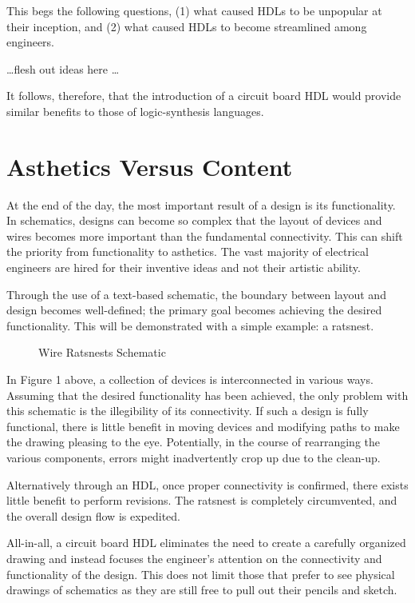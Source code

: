 \documentclass[10pt, draft, conference, letterpaper, twocolumn]{IEEEtran}
\begin{document}
	This begs the following questions, (1) what caused HDLs to be unpopular at
	their inception, and (2) what caused HDLs to become streamlined among
	engineers.

	\ldots flesh out ideas here \ldots

	It follows, therefore, that the introduction of a circuit board HDL would
	provide similar benefits to those of logic-synthesis languages.

\section{Asthetics Versus Content}
	At the end of the day, the most important result of a design is its
	functionality.  In schematics, designs can become so complex that the layout of
	devices and wires becomes more important than the fundamental connectivity.
	This can shift the priority from functionality to asthetics. The vast majority
	of electrical engineers are hired for their inventive ideas and not their
	artistic ability.

	Through the use of a text-based schematic, the boundary between layout and
	design becomes well-defined; the primary goal becomes achieving the desired
	functionality. This will be demonstrated with a simple example: a ratsnest.
	
	\begin{figure}[h!]
		\centering
		\caption{Wire Ratsnests Schematic}
	\end{figure}
	In Figure 1 above, a collection of devices is interconnected in various ways.
	Assuming that the desired functionality has been achieved, the only problem
	with this schematic is the illegibility of its connectivity. If such a design
	is fully functional, there is little benefit in moving devices and modifying
	paths to make the drawing pleasing to the eye. Potentially, in the course of
	rearranging the various components, errors might inadvertently crop up due to
	the clean-up.
	
	Alternatively through an HDL, once proper connectivity is confirmed, there
	exists little benefit to perform revisions. The ratsnest is completely
	circumvented, and the overall design flow is expedited.
	
	All-in-all, a circuit board HDL eliminates the need to create a carefully
	organized drawing and instead focuses the engineer's attention on the
	connectivity and functionality of the design.  This does not limit those that
	prefer to see physical drawings of schematics as they are still free to pull
	out their pencils and sketch.
\end{document}
